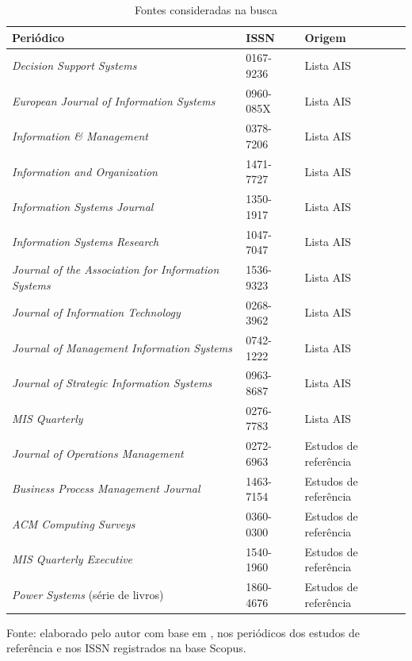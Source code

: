 \begin{table}[H]
\centering
\caption{Fontes consideradas na busca}
\label{tab:fontes}
\footnotesize
\begin{tabularx}{\textwidth}{Xll}
\toprule
\textbf{Periódico} & \textbf{ISSN} & \textbf{Origem} \\ \midrule
\textit{Decision Support Systems} & 0167-9236 & Lista AIS \\ \midrule
\textit{European Journal of Information Systems} & 0960-085X & Lista AIS \\ \midrule
\textit{Information \& Management} & 0378-7206 & Lista AIS \\ \midrule
\textit{Information and Organization} & 1471-7727 & Lista AIS \\ \midrule
\textit{Information Systems Journal} & 1350-1917 & Lista AIS \\ \midrule
\textit{Information Systems Research} & 1047-7047 & Lista AIS \\ \midrule
\textit{Journal of the Association for Information Systems} & 1536-9323 & Lista AIS \\ \midrule
\textit{Journal of Information Technology} & 0268-3962 & Lista AIS \\ \midrule
\textit{Journal of Management Information Systems} & 0742-1222 & Lista AIS \\ \midrule
\textit{Journal of Strategic Information Systems} & 0963-8687 & Lista AIS \\ \midrule
\textit{MIS Quarterly} & 0276-7783 & Lista AIS \\ \midrule
\textit{Journal of Operations Management} & 0272-6963 & Estudos de referência \\ \midrule
\textit{Business Process Management Journal} & 1463-7154 & Estudos de referência \\ \midrule
\textit{ACM Computing Surveys} & 0360-0300 & Estudos de referência \\ \midrule
\textit{MIS Quarterly Executive} & 1540-1960 & Estudos de referência \\ \midrule
\textit{Power Systems} (série de livros) & 1860-4676 & Estudos de referência \\ \bottomrule
\end{tabularx}

\vspace{0.2cm}
{\footnotesize Fonte: elaborado pelo autor com base em \citet{ais2023}, nos periódicos dos estudos de referência e nos ISSN registrados na base Scopus.}
\end{table}

